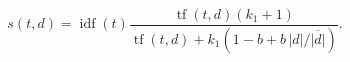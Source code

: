 \begin{equation}
s(t,d)=\operatorname{idf}(t)\frac{\operatorname{tf}(t,d)(k_1+1)}{\operatorname{tf}(t,d)+k_1(1-b+b\,|d|/\overline{|d|})}.\tag{15}\label{eq:original-15}
\end{equation}
